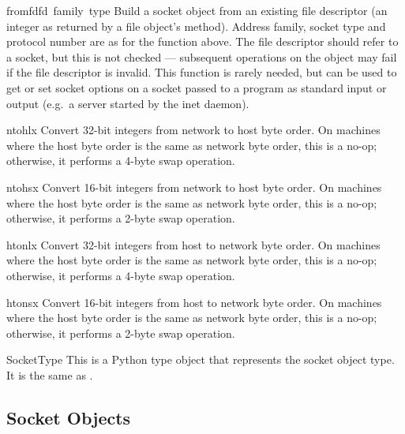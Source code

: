 \begin{funcdesc}{fromfd}{fd\, family\, type}
Build a socket object from an existing file descriptor (an integer as
returned by a file object's  method).  Address family,
socket type and protocol number are as for the  function
above.  The file descriptor should refer to a socket, but this is not
checked --- subsequent operations on the object may fail if the file
descriptor is invalid.  This function is rarely needed, but can be
used to get or set socket options on a socket passed to a program as
standard input or output (e.g.\ a server started by the \UNIX{} inet
daemon).
\end{funcdesc}

\begin{funcdesc}{ntohl}{x}
Convert 32-bit integers from network to host byte order.  On machines
where the host byte order is the same as network byte order, this is a
no-op; otherwise, it performs a 4-byte swap operation.
\end{funcdesc}

\begin{funcdesc}{ntohs}{x}
Convert 16-bit integers from network to host byte order.  On machines
where the host byte order is the same as network byte order, this is a
no-op; otherwise, it performs a 2-byte swap operation.
\end{funcdesc}

\begin{funcdesc}{htonl}{x}
Convert 32-bit integers from host to network byte order.  On machines
where the host byte order is the same as network byte order, this is a
no-op; otherwise, it performs a 4-byte swap operation.
\end{funcdesc}

\begin{funcdesc}{htons}{x}
Convert 16-bit integers from host to network byte order.  On machines
where the host byte order is the same as network byte order, this is a
no-op; otherwise, it performs a 2-byte swap operation.
\end{funcdesc}

\begin{datadesc}{SocketType}
This is a Python type object that represents the socket object type.
It is the same as .
\end{datadesc}

\subsection{Socket Objects}


